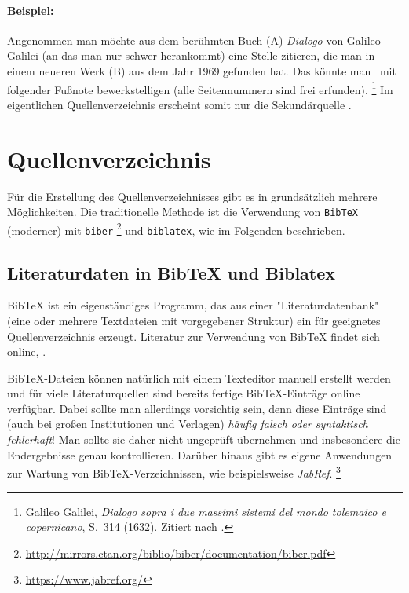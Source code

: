 \paragraph{Beispiel:} Angenommen man möchte aus dem berühmten Buch (\textrm{A}) 
\emph{Dialogo} von Galileo Galilei (an das man nur schwer herankommt) eine Stelle
zitieren, die man in einem neueren Werk (\textrm{B}) aus dem Jahr 1969 gefunden 
hat. Das könnte man \zB\ mit folgender Fußnote bewerkstelligen (alle Seitennummern
sind frei erfunden).%
\footnote{Galileo Galilei, \emph{Dialogo sopra i due massimi sistemi del
mondo tolemaico e copernicano}, S.~314 (1632). Zitiert nach
\cite[S.~59]{Hemleben1969}.}
Im eigentlichen Quellenverzeichnis erscheint somit nur die Sekundärquelle
\cite{Hemleben1969}.


\section{Quellenverzeichnis}

Für die Erstellung des Quellenverzeichnisses gibt es in \latex grundsätzlich
mehrere Möglichkeiten. Die traditionelle Methode ist die Verwendung von
\texttt{BibTeX} \cite{Patashnik1988} \bzw (moderner) mit \texttt{biber}%
\footnote{\url{http://mirrors.ctan.org/biblio/biber/documentation/biber.pdf}}
und \texttt{biblatex}, wie im Folgenden beschrieben.

\subsection{Literaturdaten in BibTeX und Biblatex}
\label{sec:bibtex}

BibTeX ist ein eigenständiges Programm, das aus einer "Literaturdatenbank"
(eine oder mehrere Textdateien mit vorgegebener Struktur) ein für \latex
geeignetes Quellenverzeichnis erzeugt. Literatur zur Verwendung von BibTeX
findet sich online, \zB \cite{Feder2006, Patashnik1988}.

BibTeX-Dateien können natürlich mit einem Texteditor manuell erstellt werden
und für viele Literaturquellen sind bereits fertige BibTeX-Einträge online
verfügbar. Dabei sollte man allerdings vorsichtig sein, denn diese Einträge
sind (auch bei großen Institutionen und Verlagen) \emph{häufig falsch oder
syntaktisch fehlerhaft}! Man sollte sie daher nicht ungeprüft übernehmen und
insbesondere die Endergebnisse genau kontrollieren. Darüber hinaus gibt es
eigene Anwendungen zur Wartung von BibTeX-Verzeichnissen, wie beispielsweise
\emph{JabRef}.%
\footnote{\url{https://www.jabref.org/}}

